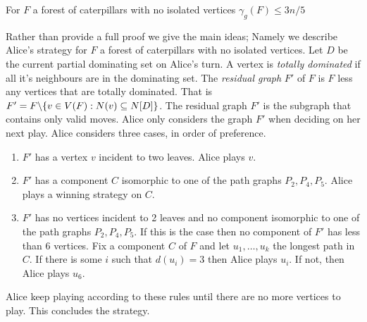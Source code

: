 \begin{theorem}\label{thm:domcat}
    For $F$ a forest of caterpillars with no isolated vertices 
    $\gamma_g(F)\leq 3n/5$ 
\end{theorem}
    
Rather than provide a full proof we give the main ideas; Namely we describe Alice's strategy for $F$ a forest of caterpillars with no isolated vertices. 
    Let $D$ be the current partial dominating set on Alice's turn. A vertex is \textit{totally dominated} if all it's neighbours are in the dominating set. The \textit{residual graph} $F'$ of $F$ is $F$ less any vertices that are totally dominated. That is $F'=F\backslash\{v\in V(F): N(v)\subseteq N[D]\}$. The residual graph $F'$ is the subgraph that contains only valid moves. Alice only considers the graph $F'$ when deciding on her next play. Alice considers three cases, in order of preference.
    \begin{enumerate}        
    \item $F'$ has a vertex $v$ incident to two leaves. Alice plays $v$. 
    
    \item $F'$ has a component $C$ isomorphic to one of the path graphs $P_2,P_4,P_5$. Alice plays a winning strategy on $C$. 
    
    \item $F'$ has no vertices incident to 2 leaves and no component isomorphic to one of the path graphs $P_2,P_4,P_5$. If this is the case then no component of $F'$ has less than 6 vertices. Fix a component $C$ of $F$ and let $u_1,\dots,u_k$ the longest path in $C$. If there is some $i$ such that $d(u_i)=3$ then Alice plays $u_i$. If not, then Alice plays $u_6$.    
    \end{enumerate}
Alice keep playing according to these rules until there are no more vertices to play. This concludes the strategy.
